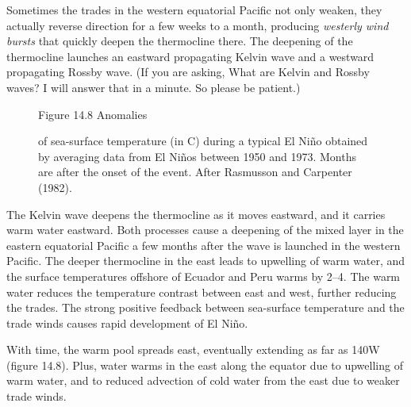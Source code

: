 Sometimes the trades in the western equatorial Pacific not only
weaken, they actually reverse direction for a few weeks to a month,
producing \textit{westerly wind bursts} that quickly deepen the
thermocline there. The deepening of the
thermocline launches an eastward
propagating Kelvin wave and a westward propagating
Rossby wave. (If you are asking, What are Kelvin
and Rossby waves? I will answer that in a minute. So please be
patient.)


\begin{figure}[p!]
\footnotesize
Figure 14.8 Anomalies
\rule{0pt}{3ex}of sea-surface temperature (in \degrees C) during a
typical El Ni\~{n}o obtained by averaging data from El Ni\~{n}os
between 1950 and 1973. Months are after the onset of the event. After
Rasmusson and Carpenter (1982).
\label{fig:elninoanomalies}
\vspace{-3ex}
\end{figure}

The Kelvin wave deepens the
thermocline as it moves eastward,
and it carries warm water eastward. Both processes cause a deepening
of the mixed layer in the
eastern equatorial Pacific a few months after the wave is launched in
the western Pacific. The deeper
thermocline in the east leads to
upwelling of warm water, and the surface
temperatures offshore of Ecuador and Peru warms by 2--4\degrees. The
warm water reduces the temperature contrast between east and west,
further reducing the trades. The strong positive feedback between
sea-surface temperature and the trade winds causes rapid development
of El Ni\~{n}o.

With time, the warm pool spreads east, eventually extending as far as
140\degrees W (figure 14.8). Plus, water warms in the east along the
equator due to upwelling of warm water, and to reduced advection of
cold water from the east due to weaker trade winds.

